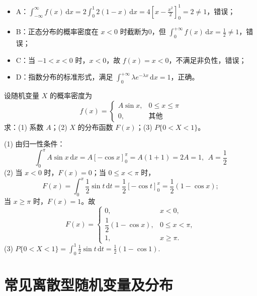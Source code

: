 \documentclass[lang=cn,11pt]{elegantbook}
\begin{document}
\begin{solution}
\begin{itemize}
    \item A：$\displaystyle\int_{-\infty}^{\infty} f(x)\,\mathrm{d}x = 2\int_0^1 2(1-x)\,\mathrm{d}x = 4\left[x-\frac{x^2}{2}\right]_0^1 = 2 \neq 1$，错误；
    \item B：正态分布的概率密度在 $x<0$ 时截断为0，但 $\displaystyle\int_0^{+\infty} f(x)\,\mathrm{d}x = \frac{1}{2} \neq 1$，错误；
    \item C：当 $-1<x<0$ 时，$x<0$，故 $f(x)=x<0$，不满足非负性，错误；
    \item D：指数分布的标准形式，满足 $\displaystyle\int_0^{+\infty} \lambda e^{-\lambda x}\,\mathrm{d}x = 1$，正确。
\end{itemize}
\end{solution}

\begin{exercise}\label{exer:2-24}
设随机变量 $X$ 的概率密度为
\[
f(x) = \begin{cases} A\sin x, & 0 \le x \le \pi \\ 0, & \text{其他} \end{cases}
\]
求：(1) 系数 $A$；(2) $X$ 的分布函数 $F(x)$；(3) $P\{0<X<1\}$。
\end{exercise}
\begin{solution}
(1) 由归一性条件：
\[
\int_{0}^{\pi} A\sin x\,\mathrm{d}x = A[-\cos x]_{0}^{\pi} = A(1+1) = 2A = 1,~~A = \dfrac{1}{2}
\]
(2) 当 $x < 0$ 时，$F(x) = 0$；当 $0 \le x < \pi$ 时，
\[
F(x) = \int_{0}^{x} \frac{1}{2}\sin t\,\mathrm{d}t = \frac{1}{2}[-\cos t]_{0}^{x} = \frac{1}{2}(1-\cos x);
\]
当 $x \ge \pi$ 时，$F(x) = 1$。故
\[
F(x) = \begin{cases}
0, & x<0, \\
\dfrac{1}{2}(1-\cos x), & 0 \le x < \pi, \\
1, & x \ge \pi.
\end{cases}
\]
(3)
\(
P\{0<X<1\} = \int_{0}^{1} \frac{1}{2}\sin t\,\mathrm{d}t = \frac{1}{2}(1-\cos 1).
\)
\end{solution}


\section{常见离散型随机变量及分布}
\end{document}
